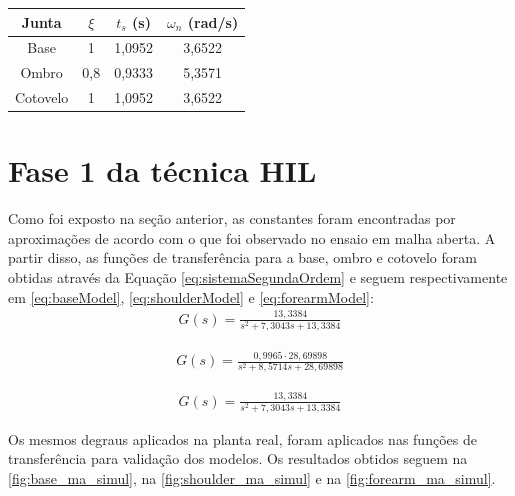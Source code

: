 \begin{center}
    \begin{tabular}{| c | c | c | c |}\hline
      \textbf{Junta}	& $\xi$ 	& $t_s$ (s)	& $\omega_n$ (rad/s)	\\ \hline
      Base		& 1 		& 1,0952	& 3,6522		\\ \hline
      Ombro		& 0,8 		& 0,9333	& 5,3571		\\ \hline
      Cotovelo		& 1 		& 1,0952	& 3,6522		\\ \hline
    \end{tabular}
    \label{tab:ctesModeloMA}
\end{center}

\section{Fase 1 da técnica HIL}

Como foi exposto na seção anterior, as constantes foram encontradas por aproximações de acordo
com o que foi observado no ensaio em malha aberta. A partir disso, as funções de transferência
para a base, ombro e cotovelo foram obtidas através da Equação \eqref{eq:sistemaSegundaOrdem} e 
seguem respectivamente em \eqref{eq:baseModel}, \eqref{eq:shoulderModel} e \eqref{eq:forearmModel}:
\begin{equation}
  \begin{gathered}
    G(s) = \frac{13,3384}{s^2 + 7,3043s + 13,3384}
  \end{gathered}
  \label{eq:baseModel}
\end{equation}

\begin{equation}
  \begin{gathered}
    G(s) = \frac{0,9965 \cdot 28,69898}{s^2 + 8,5714s + 28,69898}
  \end{gathered}
  \label{eq:shoulderModel}
\end{equation}

\begin{equation}
  \begin{gathered}
   G(s) = \frac{13,3384}{s^2 + 7,3043s + 13,3384}
  \end{gathered}
  \label{eq:forearmModel}
\end{equation}

Os mesmos degraus aplicados na planta real, foram aplicados nas funções de transferência para
validação dos modelos. Os resultados obtidos seguem na \autoref{fig:base_ma_simul}, na
\autoref{fig:shoulder_ma_simul} e na \autoref{fig:forearm_ma_simul}.


